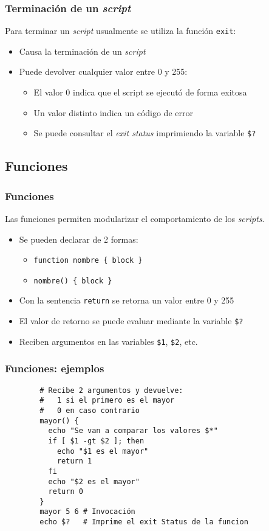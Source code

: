 \begin{frame}[fragile]
	\frametitle{Terminación de un \textit{script}}
    Para terminar un \textit{script} usualmente se utiliza la función \texttt{exit}:
	\begin{itemize}
		\item Causa la terminación de un \textit{script}
		\item Puede devolver cualquier valor entre 0 y 255:
		\begin{itemize}
			\item El valor 0 indica que el script se ejecutó de forma exitosa
			\item Un valor distinto indica un código de error
			\item Se puede consultar el \textit{exit status} imprimiendo la
              variable \texttt{\$?}
		\end{itemize}
	\end{itemize}
\end{frame}

\subsection{Funciones}
\begin{frame}[fragile]
	\frametitle{Funciones}
    Las funciones permiten modularizar el comportamiento de los \textit{scripts}.
	\begin{itemize}
		\item Se pueden declarar de 2 formas:
          \begin{itemize}
		\item \verb+function nombre { block }+
		\item \verb+nombre() { block }+
        \end{itemize}
		\item Con la sentencia \texttt{return} se retorna un valor entre 0 y 255
		\item El valor de retorno se puede evaluar mediante la variable \texttt{\$?}
		\item Reciben argumentos en las variables \texttt{\$1},
          \texttt{\$2}, etc.
	\end{itemize}
\end{frame}

\begin{frame}[fragile]
	\frametitle{Funciones: ejemplos}
	\begin{lstlisting}
		# Recibe 2 argumentos y devuelve:
		#   1 si el primero es el mayor
		#   0 en caso contrario
		mayor() {
		  echo "Se van a comparar los valores $*" 
		  if [ $1 -gt $2 ]; then
		    echo "$1 es el mayor" 
		    return 1
		  fi
		  echo "$2 es el mayor"
		  return 0
		}
		mayor 5 6 # Invocación
		echo $?   # Imprime el exit Status de la funcion
	\end{lstlisting}
\end{frame}
